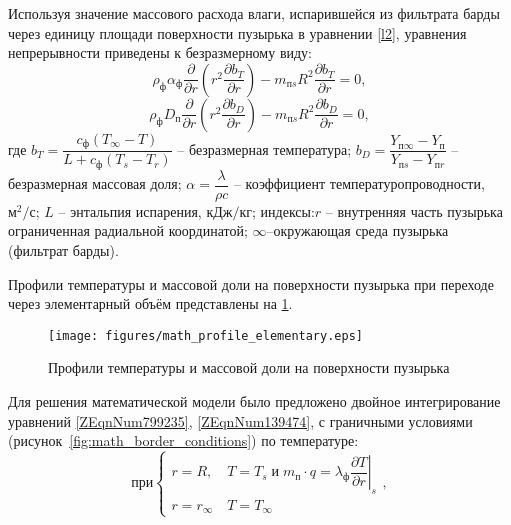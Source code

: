 Используя значение массового расхода влаги, испарившейся из фильтрата барды через единицу площади поверхности пузырька в уравнении \eqref{l2}, уравнения непрерывности приведены к безразмерному виду:
\begin{equation} \label{ZEqnNum799235} 
{\rho }_{{ ф}}{\alpha }_{{ ф}}\frac{\partial }{\partial r}\left(r^{{ 2}}\frac{\partial b_T}{\partial r}\right){ -}m_{{ п}s}R^{{ 2}}\frac{\partial b_T}{\partial r}{ =0},  
\end{equation} 
\begin{equation} \label{ZEqnNum139474} 
{\rho }_{{ ф}}D_{{ п}}\frac{\partial }{\partial r}\left(r^{{ 2}}\frac{\partial b_D}{\partial r}\right){ -}m_{{ п}s}R^{{ 2}}\frac{\partial b_D}{\partial r}{ =0},  
\end{equation} 
где ${b}_T{ =}\dfrac{c_{{ ф}}\left(T_{\infty }{ -}T\right)}{L{ +}c_{{ ф}}\left(T_s{ -}T_r\right)}$ -- безразмерная температура; $b_D{ =}\dfrac{Y_{{ п}\infty }{ -}Y_{{ п}}}{Y_{{ п}s}{ -}Y_{{ п}r}}$ -- безразмерная массовая доля; $\alpha { =}\dfrac{\lambda }{\rho c}$ -- коэффициент температуропроводности, ${{{ м}}^{{ 2}}}/{{ с}}$; $L$ -- энтальпия испарения, ${{ кДж}}/{{ кг}}$; индексы:$r$ -- внутренняя часть пузырька ограниченная радиальной координатой; $\infty $--окружающая среда пузырька (фильтрат барды).

Профили температуры и массовой доли на поверхности пузырька при переходе через элементарный объём представлены на \cref{fig:math_profile_elementary}.

\begin{figure}[htb]
\center
\texttt{[image: figures/math\_profile\_elementary.eps]}
\caption{Профили температуры и массовой доли на поверхности пузырька}\label{fig:math_profile_elementary}
\end{figure}

Для решения математической модели было предложено двойное интегрирование уравнений \eqref{ZEqnNum799235}, \eqref{ZEqnNum139474}, с граничными условиями (рисунок~\ref{fig:math_border_conditions}) по температуре:
\begin{displaymath}
\text{при} \left\{ \begin{array}{l}
r{ =}R,\quad T{ =}T_s\; и\; m_{{ п}}\cdot q{ =}{\lambda }_{{ ф}}{\left.\dfrac{\partial T}{\partial r}\right|}_s \\ 
r{ =}r_{\infty }\quad T{ =}T_{\infty } \end{array}
\right.\label{3)},
\end{displaymath} 

